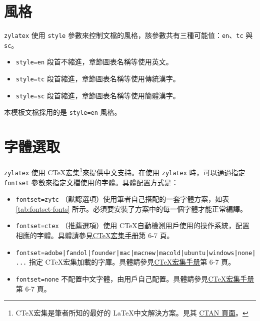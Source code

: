 \documentclass[
oneside,
12pt,
]{book}
\begin{document}
\section{風格}

\texttt{zylatex} 使用 \texttt{style} 參數來控制文檔的風格，該參數共有三種可能值：\texttt{en}、\texttt{tc} 與 \texttt{sc}。

\begin{itemize}
\item \texttt{style=en} 段首不縮進，章節圖表名稱等使用英文。
\item \texttt{style=tc} 段首縮進，章節圖表名稱等使用傳統漢字。
\item \texttt{style=sc} 段首縮進，章節圖表名稱等使用簡體漢字。
\end{itemize}

本模板文檔採用的是 \texttt{style=en} 風格。

\section{字體選取}

\texttt{zylatex} 使用 C\TeX 宏集\footnote{C\TeX 宏集是筆者所知的最好的 \LaTeX 中文解決方案。見其 \href{https://ctan.org/pkg/ctex}{CTAN 頁面}。}來提供中文支持。在使用 \texttt{zylatex} 時，可以通過指定 \texttt{fontset} 參數來指定文檔使用的字體。具體配置方式是：

\begin{itemize}
\item \texttt{fontset=zytc} （默認選項）使用筆者自己搭配的一套字體方案，如表 \ref{tab:fontset-fonts} 所示。必須要安裝了方案中的每一個字體才能正常編譯。
\item \texttt{fontset=ctex} （推薦選項）使用 C\TeX 自動檢測用戶使用的操作系統，配置相應的字體。具體請參見\href{http://mirrors.ctan.org/language/chinese/ctex/ctex.pdf}{C\TeX 宏集手册}第 6-7 頁。
\item \texttt{fontset=adobe|fandol|founder|mac|macnew|macold|ubuntu|windows|none|...} 指定 C\TeX 宏集加載的字庫。具體請參見\href{http://mirrors.ctan.org/language/chinese/ctex/ctex.pdf}{C\TeX 宏集手册}第 6-7 頁。
\item \texttt{fontset=none} 不配置中文字體，由用戶自己配置。具體請參見\href{http://mirrors.ctan.org/language/chinese/ctex/ctex.pdf}{C\TeX 宏集手册}第 6-7 頁。
\end{itemize}
\end{document}
